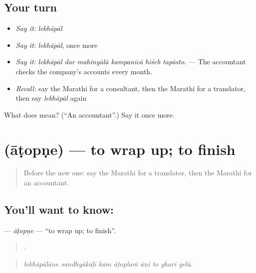 \subsection*{Your turn}
\begin{itemize}
\raggedright
  \item \emph{Say it:} \emph{lekhāpāl}
  \item \emph{Say it:} \emph{lekhāpāl}, once more
  \item \emph{Say it:} \emph{lekhāpāl dar mahinyālā kampanīcā hiśeb tapāsto.} — The accountant checks the company's accounts every month.
  \item \emph{Recall:} say the Marathi for a consultant, then the Marathi for a translator, then say \emph{lekhāpāl} again
\end{itemize}

\begin{tcolorbox}[breakable,colback=teal!4,colframe=teal!35!black,title={Before you move on}]
What does  mean? (\textquotedblleft{}An accountant\textquotedblright{}.) Say it once more.
\end{tcolorbox}
\section[\texorpdfstring{\mr{आटोपणे} (āṭopṇe)}{आटोपणे (āṭopṇe)}]{ (āṭopṇe) — to wrap up; to finish}

\label{lesson:MR-C515-atopne}



\begin{quote}
Before the new one: say the Marathi for a translator, then the Marathi for an accountant.
\end{quote}

\subsection*{You'll want to know: }
\textbf{} — \emph{āṭopṇe} — \textquotedblleft{}to wrap up; to finish\textquotedblright{}.

\begin{quote}
       .
\end{quote}

\begin{quote}
\emph{lekhāpālāne sandhyākāḷī kām āṭoplaṁ āṇi to gharī gelā.}
\end{quote}

